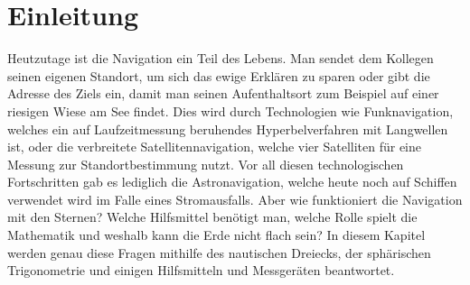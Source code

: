

\section{Einleitung}
Heutzutage ist die Navigation ein Teil des Lebens. 
Man sendet dem Kollegen seinen eigenen Standort, um sich das ewige Erklären zu sparen oder gibt die Adresse des Ziels ein, damit man seinen Aufenthaltsort zum Beispiel auf einer riesigen Wiese am See findet. 
Dies wird durch Technologien wie Funknavigation, welches ein auf Laufzeitmessung beruhendes Hyperbelverfahren mit Langwellen ist, oder die verbreitete Satellitennavigation, welche vier Satelliten für eine Messung zur Standortbestimmung nutzt.
Vor all diesen technologischen Fortschritten gab es lediglich die Astronavigation, welche heute noch auf Schiffen verwendet wird im Falle eines Stromausfalls. 
Aber wie funktioniert die Navigation mit den Sternen? Welche Hilfsmittel benötigt man, welche Rolle spielt die Mathematik und weshalb kann die Erde nicht flach sein? 
In diesem Kapitel werden genau diese Fragen mithilfe des nautischen Dreiecks, der sphärischen Trigonometrie und einigen Hilfsmitteln und Messgeräten beantwortet.